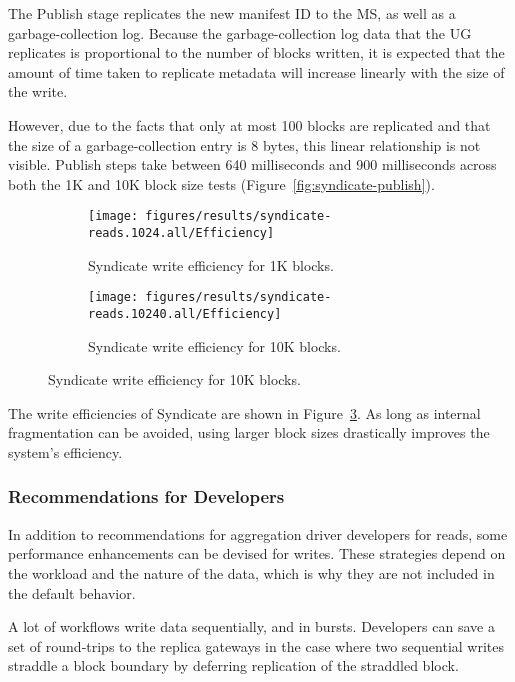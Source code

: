 The Publish stage replicates the new manifest ID to the MS, as well as a
garbage-collection log.  Because the garbage-collection log data that the UG
replicates is proportional to the number of blocks written, it is expected that
the amount of time taken to replicate metadata will increase linearly with the
size of the write.

However, due to the facts that only at most 100 blocks are replicated and that
the size of a garbage-collection entry is 8 bytes, this linear relationship is
not visible.  Publish steps take between 640 milliseconds and 900 milliseconds
across both the 1K and 10K block size tests
(Figure~\ref{fig:syndicate-publish}).

\begin{figure}[htp!]
   \centering
   \caption{Box-and-whiskers plots of the efficiencies of Syndicate
   writes.}
   \begin{subfigure}[b]{.8\textwidth}
      \texttt{[image: figures/results/syndicate-reads.1024.all/Efficiency]}
      \label{fig:syndicate-efficiency-1k}
      \caption{Syndicate write efficiency for 1K blocks.}
   \end{subfigure}
   \begin{subfigure}[b]{.8\textwidth}
      \texttt{[image: figures/results/syndicate-reads.10240.all/Efficiency]}
      \label{fig:syndicate-efficiency-1k}
      \caption{Syndicate write efficiency for 10K blocks.}
   \end{subfigure}
   \label{fig:syndicate-write-efficiency}
\end{figure}

The write efficiencies of Syndicate are shown in
Figure~\ref{fig:syndicate-write-efficiency}.  As long as internal fragmentation
can be avoided, using larger block sizes drastically improves the system's
efficiency.

\subsubsection{Recommendations for Developers}

In addition to recommendations for aggregation driver developers for reads, some
performance enhancements can be devised for writes.  These strategies depend on
the workload and the nature of the data, which is why they are not included in
the default behavior.

\hfill \break
{}
\hfill \break

A lot of workflows write data sequentially, and in bursts.
Developers can save a set of round-trips to the replica gateways
in the case where two sequential writes straddle a block boundary
by deferring replication of the straddled block.


